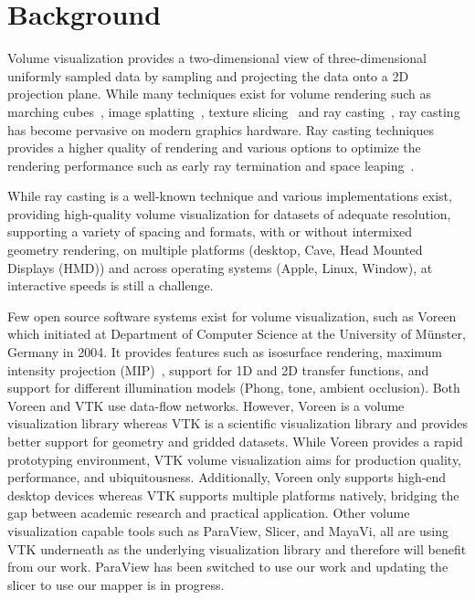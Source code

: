 \section{Background}
\label{relatedwork}

Volume visualization provides a two-dimensional view of three-dimensional
uniformly sampled data by sampling and projecting the data onto a 2D
projection plane.  While many techniques exist for volume rendering such as
marching cubes~\citep{lorensen_marching_1987}, image
splatting~\citep{westover_footprint_1990}, texture
slicing~\citep{rezk-salama_interactive_2000, engel_high-quality_2001} and ray
casting~\citep{hsu_segmented_1993, ma_parallel_1995, ma_scalable_1997,
heng_gpu-based_2005}, ray casting has become pervasive on modern graphics
hardware. Ray casting techniques provides a higher quality of rendering and
various options to optimize the rendering performance such as early ray
termination and space leaping~\citep{yagel_accelerating_1993}.

While ray casting is a well-known technique and various implementations exist,
providing high-quality volume visualization for datasets of adequate
resolution, supporting a variety of spacing and formats, with or without
intermixed geometry rendering, on multiple platforms (desktop, Cave, Head
Mounted Displays (HMD)) and across operating systems (Apple, Linux, Window), at
interactive speeds is still a challenge.

Few open source software systems exist for volume visualization, such as
Voreen~\citep{meyer-spradow_voreen:_2009} which initiated at Department of
Computer Science at the University of M\"unster, Germany in 2004.  It provides
features such as isosurface rendering, maximum intensity projection
(MIP)~\citep{wallis_three-dimensional_1989}, support for 1D and 2D transfer
functions, and support for different illumination models (Phong, tone, ambient
occlusion). Both Voreen and VTK use data-flow networks. However, Voreen is a
volume visualization library whereas VTK is a scientific visualization library
and provides better support for geometry and gridded datasets. While Voreen
provides a rapid prototyping environment, VTK volume visualization aims for
production quality, performance, and ubiquitousness. Additionally, Voreen only
supports high-end desktop devices whereas VTK supports multiple platforms
natively, bridging the gap between academic research and practical application.
Other volume visualization capable tools such as ParaView, Slicer, and MayaVi,
all are using VTK underneath as the underlying visualization library and therefore
will benefit from our work. ParaView has been switched to use our work and
updating the slicer to use our mapper is in progress.

